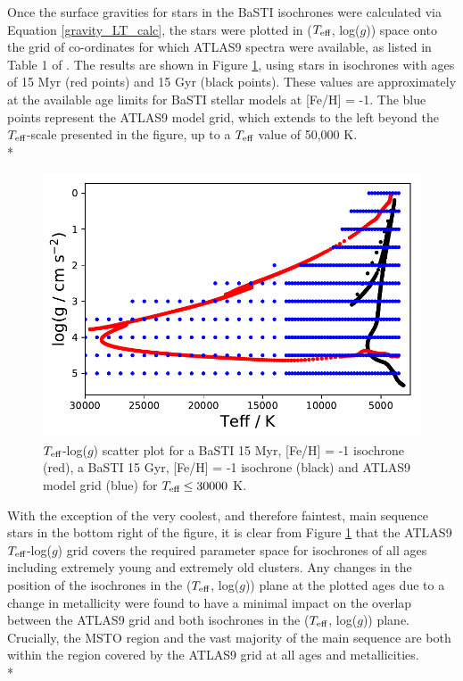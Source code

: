 \documentclass[12pt, a4paper]{report}
\begin{document}
Once the surface gravities for stars in the BaSTI isochrones were calculated via Equation \ref{gravity_LT_calc}, the stars were plotted in ($T_{\textnormal{eff}}$, log($g$)) space onto the grid of co-ordinates for which ATLAS9 spectra were available, as listed in Table 1 of \cite{2004astro.ph..5087C}. The results are shown in Figure \ref{Teff-logg coverage}, using stars in isochrones with ages of 15 Myr (red points) and 15 Gyr (black points). These values are approximately at the available age limits for BaSTI stellar models at [Fe/H] = -1. The blue points represent the ATLAS9 model grid, which extends to the left beyond the $T_{\textnormal{eff}}$-scale presented in the figure, up to a $T_{\textnormal{eff}}$ value of 50,000 K.\\*

\begin{figure}[h!]
\begin{center}
\includegraphics[width=1.0\textwidth]{ATLAS9_grid_BaSTI_coverage_2ages_max.pdf}
\caption{$T_{\textnormal{eff}}$-log($g$) scatter plot for a BaSTI 15 Myr, [Fe/H] = -1 isochrone (red), a BaSTI 15 Gyr, [Fe/H] = -1 isochrone (black) and ATLAS9 model grid (blue) for $T_{\textnormal{eff}} \leq 30000$ K.}
\label{Teff-logg coverage}
\end{center}
\end{figure}

With the exception of the very coolest, and therefore faintest, main sequence stars in the bottom right of the figure, it is clear from Figure \ref{Teff-logg coverage} that the ATLAS9 $T_{\textnormal{eff}}$-log($g$) grid covers the required parameter space for isochrones of all ages including extremely young and extremely old clusters. Any changes in the position of the isochrones in the ($T_{\textnormal{eff}}$, log($g$)) plane at the plotted ages due to a change in metallicity were found to have a minimal impact on the overlap between the ATLAS9 grid and both isochrones in the ($T_{\textnormal{eff}}$, log($g$)) plane. Crucially, the MSTO region and the vast majority of the main sequence are both within the region covered by the ATLAS9 grid at all ages and metallicities. \\*
\end{document}
